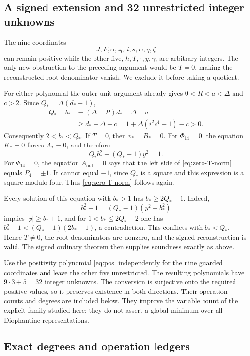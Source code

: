 \subsection{A signed extension and 32 unrestricted integer unknowns}

The nine coordinates
\[
 J,F,\alpha,z_0,i,s,w,\eta,\zeta
\]
can remain positive while the other five,
\(h,T,\tau,y,\gamma\), are arbitrary integers. The only new
obstruction to the preceding argument would be \(T=0\), making
the reconstructed-root denominator vanish. We exclude it before
taking a quotient.

For either polynomial the outer unit argument already gives
\(0<R<a<\Delta\) and \(c>2\). Since
\(Q_*=\Delta(d_*-1)\),
\begin{align*}
 Q_*-b_*&=(\Delta-R)d_*-\Delta-c\\
 &\ge d_*-\Delta-c
   =1+\Delta(i^2c^4-1)-c>0.
\end{align*}
Consequently \(2<b_*<Q_*\). If \(T=0\), then \(v_*=B_*=0\).
For \(\Phi_{14}=0\), the equation \(K_*=0\) forces \(A_*=0\),
and therefore
\begin{equation}
 Q_*b_*^2-(Q_*-1)y^2=1.\label{eq:zero-T-norm}
\end{equation}
For \(\Psi_{14}=0\), the equation
\(A_{\mathrm{out}}=0\) says that the left side of
\eqref{eq:zero-T-norm} equals \(P_4=\pm1\). It cannot equal
\(-1\), since \(Q_*\) is a square and this expression is a
square modulo four. Thus \eqref{eq:zero-T-norm} follows again.

Every solution of this equation with \(b_*>1\) has
\(b_*\ge2Q_*-1\). Indeed,
\[
 b_*^2-1=(Q_*-1)(y^2-b_*^2)
\]
implies \(|y|\ge b_*+1\), and for \(1<b_*\le2Q_*-2\)
one has \(b_*^2-1<(Q_*-1)(2b_*+1)\), a contradiction.
This conflicts with \(b_*<Q_*\). Hence \(T\ne0\), the
root denominators are nonzero, and the signed reconstruction is valid.
The signed ordinary theorem then supplies soundness exactly as above.

Use the positivity polynomial \eqref{eq:pos} independently for the
nine guarded coordinates and leave the other five unrestricted.
The resulting polynomials have \(9\cdot3+5=32\) integer unknowns.
The conversion is surjective onto the required positive values, so it
preserves existence in both directions. Their operation counts and
degrees are included below. They improve the variable count of the
explicit family studied here; they do not assert a global minimum over
all Diophantine representations.

\subsection{Exact degrees and operation ledgers}

